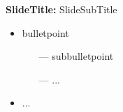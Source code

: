 \documentclass{beamer} %
\begin{document}
\appendix
\backupbegin
\renewcommand{\theframenumber}{\Roman{framenumber}}

\begin{frame}[label=appendix]{\textbf{SlideTitle:} SlideSubTitle}
	\begin{itemize}
	    \item bulletpoint
    	\begin{itemize}
    	    \item[---] subbulletpoint
    	    \item[---] ...
    	\end{itemize}
    	\item ...
	\end{itemize}
	\hspace{\fill}\hyperlink{descr}{}
\end{frame}

\backupend
\end{document}
